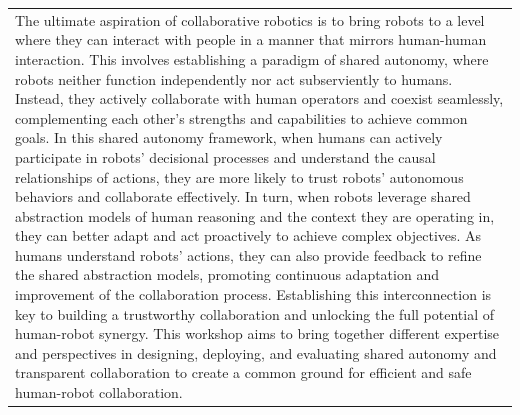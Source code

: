 \documentclass[
	openany, %
	parskip=full, %
	12pt, %
	a4paper, %
]{conferencebooklet} %
\begin{document}
\begin{table}[h!]
{\begin{tabular}{p{100mm}}
            The ultimate aspiration of collaborative robotics is to bring robots to a level where they can interact with people in a manner that mirrors human-human interaction. This involves establishing a paradigm of shared autonomy, where robots neither function independently nor act subserviently to humans. Instead, they actively collaborate with human operators and coexist seamlessly, complementing each other’s strengths and capabilities to achieve common goals.  In this shared autonomy framework, when humans can actively participate in robots’ decisional processes and understand the causal relationships of actions, they are more likely to trust robots’ autonomous behaviors and collaborate effectively. In turn, when robots leverage shared abstraction models of human reasoning and the context they are operating in, they can better adapt and act proactively to achieve complex objectives. As humans understand robots’ actions, they can also provide feedback to refine the shared abstraction models, promoting continuous adaptation and improvement of the collaboration process. Establishing this interconnection is key to building a trustworthy collaboration and unlocking the full potential of human-robot synergy. This workshop aims to bring together different expertise and perspectives in designing, deploying, and evaluating shared autonomy and transparent collaboration to create a common ground for efficient and safe human-robot collaboration.
        \end{tabular}
    }
\end{table}

\end{document}
